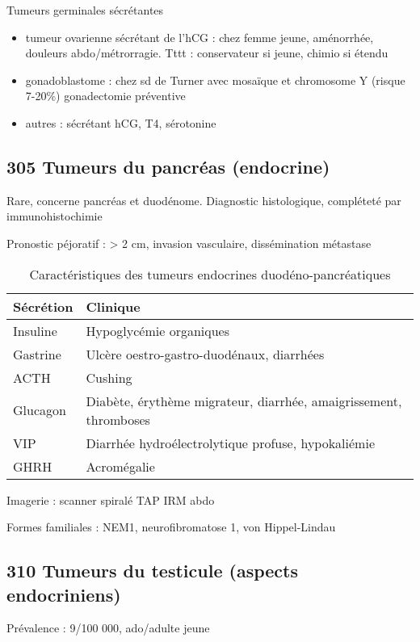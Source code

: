 \documentclass[11pt]{article}
\begin{document}
Tumeurs germinales sécrétantes
\begin{itemize}
\item tumeur ovarienne sécrétant de l'hCG : chez femme jeune, aménorrhée, douleurs
abdo/métrorragie. Tttt : conservateur si jeune, chimio si étendu
\item gonadoblastome : chez sd de Turner avec mosaïque et chromosome Y (risque
7-20\%) \thus gonadectomie préventive
\item autres : sécrétant hCG, T4, sérotonine
\end{itemize}

\subsection{305 \textdagger{} Tumeurs du pancréas (endocrine)}
\label{sec:org1a4a6f7}
Rare, concerne pancréas et duodénome. Diagnostic histologique, compléteté par
immunohistochimie

Pronostic péjoratif : > 2 cm, invasion vasculaire, dissémination métastase

\begin{table}[htbp]
\caption{Caractéristiques des tumeurs endocrines duodéno-pancréatiques}
\centering
\begin{tabular}{ll}
Sécrétion & Clinique\\
\hline
Insuline & Hypoglycémie organiques\\
Gastrine & Ulcère oestro-gastro-duodénaux, diarrhées\\
ACTH & Cushing\\
Glucagon & Diabète, érythème migrateur, diarrhée, amaigrissement, thromboses\\
VIP & Diarrhée hydroélectrolytique profuse, hypokaliémie\\
GHRH & Acromégalie\\
\end{tabular}
\end{table}

Imagerie : scanner spiralé TAP \textpm{} IRM abdo

Formes familiales : NEM1, neurofibromatose 1, von Hippel-Lindau

\subsection{310 \textdagger{} Tumeurs du testicule (aspects endocriniens)}
\label{sec:orga43c00b}

Prévalence : 9/100 000, ado/adulte jeune
\end{document}
